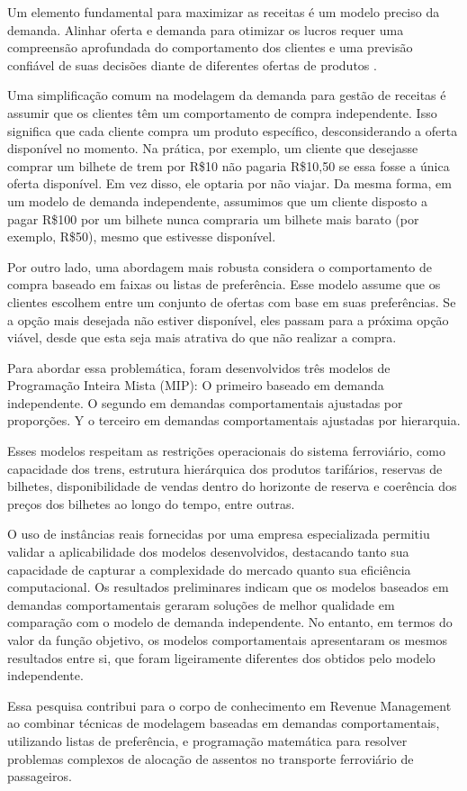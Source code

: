 Um elemento fundamental para maximizar as receitas é um modelo preciso da demanda. Alinhar oferta e demanda para otimizar os lucros requer uma compreensão aprofundada do comportamento dos clientes e uma previsão confiável de suas decisões diante de diferentes ofertas de produtos \citep{ZHAO2019776}.

Uma simplificação comum na modelagem da demanda para gestão de receitas é assumir que os clientes têm um comportamento de compra independente. Isso significa que cada cliente compra um produto específico, desconsiderando a oferta disponível no momento. Na prática, por exemplo, um cliente que desejasse comprar um bilhete de trem por R\$10 não pagaria R\$10,50 se essa fosse a única oferta disponível. Em vez disso, ele optaria por não viajar. Da mesma forma, em um modelo de demanda independente, assumimos que um cliente disposto a pagar R\$100 por um bilhete nunca compraria um bilhete mais barato (por exemplo, R\$50), mesmo que estivesse disponível.

Por outro lado, uma abordagem mais robusta considera o comportamento de compra baseado em faixas ou listas de preferência. Esse modelo assume que os clientes escolhem entre um conjunto de ofertas com base em suas preferências. Se a opção mais desejada não estiver disponível, eles passam para a próxima opção viável, desde que esta seja mais atrativa do que não realizar a compra.

Para abordar essa problemática, foram desenvolvidos três modelos de Programação Inteira Mista (MIP): O primeiro baseado em demanda independente. O segundo em demandas comportamentais ajustadas por proporções. Y o terceiro em demandas comportamentais ajustadas por hierarquia.

Esses modelos respeitam as restrições operacionais do sistema ferroviário, como capacidade dos trens, estrutura hierárquica dos produtos tarifários, reservas de bilhetes, disponibilidade de vendas dentro do horizonte de reserva e coerência dos preços dos bilhetes ao longo do tempo, entre outras.

O uso de instâncias reais fornecidas por uma empresa especializada permitiu validar a aplicabilidade dos modelos desenvolvidos, destacando tanto sua capacidade de capturar a complexidade do mercado quanto sua eficiência computacional. Os resultados preliminares indicam que os modelos baseados em demandas comportamentais geraram soluções de melhor qualidade em comparação com o modelo de demanda independente. No entanto, em termos do valor da função objetivo, os modelos comportamentais apresentaram os mesmos resultados entre si, que foram ligeiramente diferentes dos obtidos pelo modelo independente.

Essa pesquisa contribui para o corpo de conhecimento em Revenue Management ao combinar técnicas de modelagem baseadas em demandas comportamentais, utilizando listas de preferência, e programação matemática para resolver problemas complexos de alocação de assentos no transporte ferroviário de passageiros.
